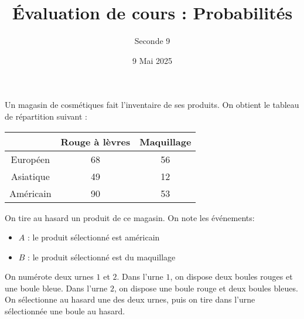 \documentclass{exam}
\title{Évaluation de cours : Probabilités}
\date{9 Mai 2025}
\author{Seconde 9}
\begin{document}
\maketitle
\begin{questions}
\question[6]
Un magasin de cosmétiques fait l'inventaire de ses produits. On obtient le tableau de répartition suivant :
\begin{center}
\begin{tabular}{|c|c|c|}
\hline
&Rouge à lèvres&Maquillage\\
\hline
Européen&\num{68}&\num{56}\\
\hline
Asiatique&\num{49}&\num{12}\\
\hline
Américain&\num{90}&\num{53}\\
\hline
\end{tabular}
\end{center}
On tire au hasard un produit de ce magasin. On note les événements:
\begin{itemize}
\item $A$ : \og le produit sélectionné est américain \fg
\item $B$ : \og le produit sélectionné est du maquillage \fg
\end{itemize}
\vspace*{0.5cm}
\vspace*{0.5cm}
\question[4]
On numérote deux urnes $1$ et $2$. Dans l'urne $1$, on dispose deux boules rouges et une boule bleue. Dans l'urne $2$, on dispose une boule rouge et deux boules bleues. On sélectionne au hasard une des deux urnes, puis on tire dans l'urne sélectionnée une boule au hasard.
\begin{parts}

\end{parts}
\end{questions}
\end{document}
